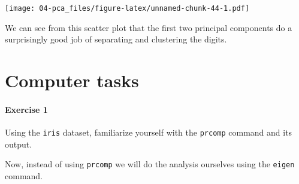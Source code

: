 \documentclass[
]{book}
\newenvironment{Shaded}{\begin{snugshade}}{\end{snugshade}}
\newcommand{\AttributeTok}[1]{\textcolor[rgb]{0.77,0.63,0.00}{#1}}
\newcommand{\CommentTok}[1]{\textcolor[rgb]{0.56,0.35,0.01}{\textit{#1}}}
\newcommand{\DecValTok}[1]{\textcolor[rgb]{0.00,0.00,0.81}{#1}}
\newcommand{\FunctionTok}[1]{\textcolor[rgb]{0.00,0.00,0.00}{#1}}
\newcommand{\NormalTok}[1]{#1}
\newcommand{\OtherTok}[1]{\textcolor[rgb]{0.56,0.35,0.01}{#1}}
\newcommand{\SpecialCharTok}[1]{\textcolor[rgb]{0.00,0.00,0.00}{#1}}
\theoremstyle{definition}
\theoremstyle{definition}
\theoremstyle{definition}
\theoremstyle{definition}
\theoremstyle{remark}
\begin{document}
\begin{Shaded}
\end{Shaded}

\texttt{[image: 04-pca\_files/figure-latex/unnamed-chunk-44-1.pdf]}

We can see from this scatter plot that the first two principal components do a surprisingly good job of separating and clustering the digits.

\hypertarget{pca-comptask}{%
\section{Computer tasks}\label{pca-comptask}}

\hypertarget{exercise-1}{%
\paragraph*{Exercise 1}\label{exercise-1}}

Using the \texttt{iris} dataset, familiarize yourself with the \texttt{prcomp} command and its output.

Now, instead of using \texttt{prcomp} we will do the analysis ourselves using the \texttt{eigen} command.
\end{document}
